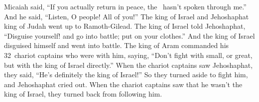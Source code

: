 \begin{inparaenum}
   Micaiah said, ``If you actually return in peace, the \lord\ hasn't spoken through me.'' And he said, ``Listen, O people! All of you!''%
   The king of Israel and Jehoshaphat king of Judah went up to Ramoth-Gilead.%
   The king of Israel told Jehoshaphat, ``Disguise yourself! and go into battle; put on your clothes.'' And the king of Israel disguised himself and went into battle.%
   The king of Aram commanded his 32~chariot captains who were with him, saying, ``Don't fight with small, or great, but with the king of Israel directly.''%
   When the chariot captains saw Jehoshaphat, they said, ``He's definitely the king of Israel!'' So they turned aside to fight him, and Jehoshaphat cried out.%
   When the chariot captains saw that he wasn't the king of Israel, they turned back from following him.%
  

\end{inparaenum}
